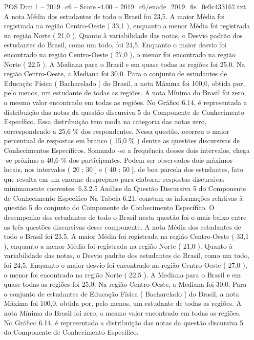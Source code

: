 \begin{textsample}{POS Dim 1 – 2019\_c6 – Score -4.00 – 2019\_c6/enade\_2019\_fis\_0e9c433167.txt}
A nota Média dos estudantes de todo o Brasil foi 23,5.
A maior Média foi registrada na região Centro-Oeste ( 33,1 ), enquanto a menor Média foi registrada na região Norte ( 21,0 ).
Quanto à variabilidade das notas, o Desvio padrão dos estudantes do Brasil, como um todo, foi 24,5.
Enquanto o maior desvio foi encontrado na região Centro-Oeste ( 27,0 ), o menor foi encontrado na região Norte ( 22,5 ).
A Mediana para o Brasil e em quase todas as regiões foi 25,0.
Na região Centro-Oeste, a Mediana foi 30,0.
Para o conjunto de estudantes de Educação Física ( Bacharelado ) do Brasil, a nota Máxima foi 100,0, obtida por, pelo menos, um estudante de todas as regiões.
A nota Mínima do Brasil foi zero, o mesmo valor encontrado em todas as regiões.
No Gráfico 6.14, é representada a distribuição das notas da questão discursiva 5 do Componente de Conhecimento Específico.
Essa distribuição tem moda na categoria das notas zero, correspondendo a 25,6 \% dos respondentes.
Nessa questão, ocorreu o maior percentual de respostas em branco ( 15,0 \% ) dentre as questões discursivas de Conhecimentos Específicos.
Somando -se a frequência desses dois intervalos, chega -se próximo a 40,6 \% dos participantes.
Podem ser observados dois máximos locais, nos intervalos ( 20 ; 30 ] e ( 40 ; 50 ]. de boa parcela dos estudantes, fato que resulta em um enorme despreparo para elaborar respostas discursivas minimamente coerentes. 6.3.2.5 Análise da Questão Discursiva 5 do Componente de Conhecimento Específico Na Tabela 6.21, constam as informações relativas à questão 5 do conjunto do Componente de Conhecimento Específico.
O desempenho dos estudantes de todo o Brasil nesta questão foi o mais baixo entre as três questões discursivas desse componente.
A nota Média dos estudantes de todo o Brasil foi 23,5.
A maior Média foi registrada na região Centro-Oeste ( 33,1 ), enquanto a menor Média foi registrada na região Norte ( 21,0 ).
Quanto à variabilidade das notas, o Desvio padrão dos estudantes do Brasil, como um todo, foi 24,5.
Enquanto o maior desvio foi encontrado na região Centro-Oeste ( 27,0 ), o menor foi encontrado na região Norte ( 22,5 ).
A Mediana para o Brasil e em quase todas as regiões foi 25,0.
Na região Centro-Oeste, a Mediana foi 30,0.
Para o conjunto de estudantes de Educação Física ( Bacharelado ) do Brasil, a nota Máxima foi 100,0, obtida por, pelo menos, um estudante de todas as regiões.
A nota Mínima do Brasil foi zero, o mesmo valor encontrado em todas as regiões.
No Gráfico 6.14, é representada a distribuição das notas da questão discursiva 5 do Componente de Conhecimento Específico.

\end{textsample}
